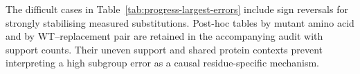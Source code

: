 The difficult cases in Table~\ref{tab:progress-largest-errors} include sign reversals for strongly
stabilising measured substitutions. Post-hoc tables by mutant amino acid and by WT--replacement
pair are retained in the accompanying audit with support counts. Their uneven support and shared
protein contexts prevent interpreting a high subgroup error as a causal residue-specific mechanism.
